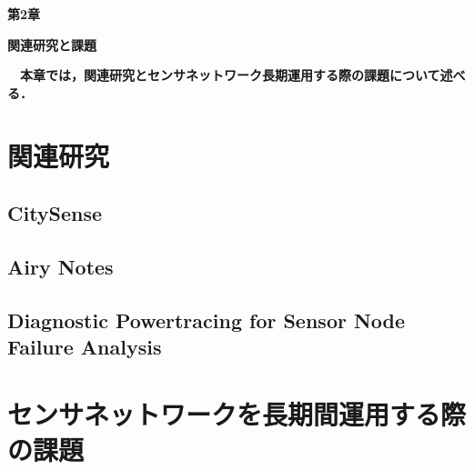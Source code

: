 \newpage
\setcounter{chapter}{2}
\setcounter{section}{0}

\begin{center}
\vspace{0.5cm}
\huge{\bf 第2章}
\par
\vspace{1cm}
\hrulefill
\par
\vspace{1cm}
\huge{\bf 関連研究と課題}
\par
\vspace{0.5cm}
\hrulefill
\vspace{1cm}
\par

\begin{flushleft}
\large{{\bf　本章では，関連研究とセンサネットワーク長期運用する際の課題について述べる．}}
\end{flushleft}
\end{center}


\newpage

\section{関連研究}

\newpage

\subsection{CitySense}

\newpage

\subsection{Airy Notes}

\newpage

\subsection{Diagnostic Powertracing for Sensor Node Failure Analysis}

\newpage

\section{センサネットワークを長期間運用する際の課題}

